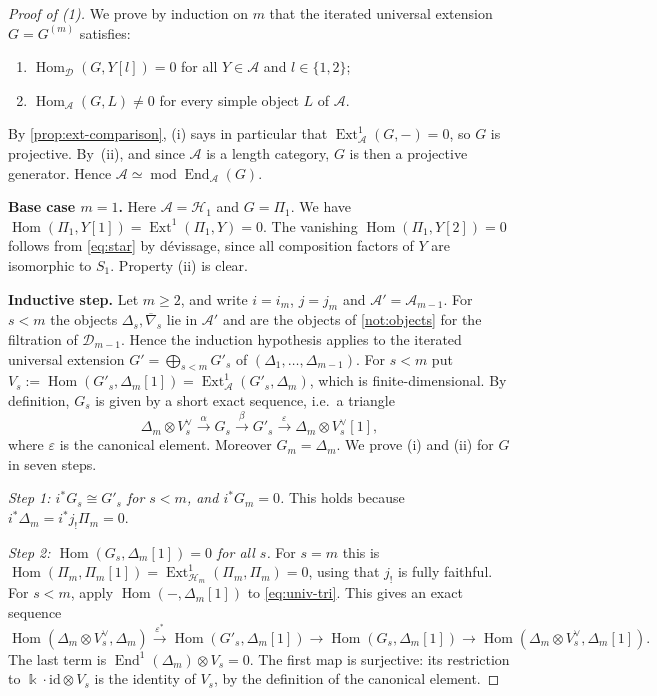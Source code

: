 \documentclass[11pt,reqno]{amsart}
\theoremstyle{plain}
\theoremstyle{definition}
\theoremstyle{remark}
\newcommand{\kk}{\Bbbk}
\DeclareMathOperator{\Hom}{Hom}
\DeclareMathOperator{\End}{End}
\DeclareMathOperator{\Ext}{Ext}
\newcommand{\modd}{\operatorname{mod}}
\newcommand{\nablabar}{\overline{\nabla}}
\newcommand{\cD}{\mathcal{D}}
\newcommand{\cA}{\mathcal{A}}
\newcommand{\cH}{\mathcal{H}}
\begin{document}
\begin{proof}[Proof of \textup{(1)}]
We prove by induction on $m$ that the iterated universal extension $G=G^{(m)}$ satisfies:
\begin{enumerate}[label=(\roman*)]
\item $\Hom_\cD(G,Y[l])=0$ for all $Y\in\cA$ and $l\in\{1,2\}$;
\item $\Hom_\cA(G,L)\ne0$ for every simple object $L$ of $\cA$.
\end{enumerate}
By \cref{prop:ext-comparison}, (i) says in particular that $\Ext^1_\cA(G,-)=0$, so $G$ is projective. By~(ii), and since $\cA$ is a length category, $G$ is then a projective generator. Hence $\cA\simeq\modd\End_\cA(G)$.

\smallskip\noindent\textbf{Base case $m=1$.} Here $\cA=\cH_1$ and $G=\Pi_1$. We have $\Hom(\Pi_1,Y[1])=\Ext^1(\Pi_1,Y)=0$. The vanishing $\Hom(\Pi_1,Y[2])=0$ follows from \eqref{eq:star} by d\'evissage, since all composition factors of $Y$ are isomorphic to $S_1$. Property (ii) is clear.

\smallskip\noindent\textbf{Inductive step.} Let $m\ge2$, and write $i=i_m$, $j=j_m$ and $\cA'=\cA_{m-1}$. For $s<m$ the objects $\Delta_s,\nablabar_s$ lie in $\cA'$ and are the objects of \cref{not:objects} for the filtration of $\cD_{m-1}$. Hence the induction hypothesis applies to the iterated universal extension $G'=\bigoplus_{s<m}G'_s$ of $(\Delta_1,\dots,\Delta_{m-1})$. For $s<m$ put $V_s:=\Hom(G'_s,\Delta_m[1])=\Ext^1_\cA(G'_s,\Delta_m)$, which is finite-dimensional. By definition, $G_s$ is given by a short exact sequence, i.e.\ a triangle
\begin{equation}\label{eq:univ-tri}
\Delta_m\otimes V_s^\vee\xrightarrow{\alpha}G_s\xrightarrow{\beta}G'_s\xrightarrow{\varepsilon}\Delta_m\otimes V_s^\vee[1],
\end{equation}
where $\varepsilon$ is the canonical element. Moreover $G_m=\Delta_m$. We prove (i) and (ii) for $G$ in seven steps.

\emph{Step 1: $i^*G_s\cong G'_s$ for $s<m$, and $i^*G_m=0$.} This holds because $i^*\Delta_m=i^*j_!\Pi_m=0$.

\emph{Step 2: $\Hom(G_s,\Delta_m[1])=0$ for all $s$.} For $s=m$ this is $\Hom(\Pi_m,\Pi_m[1])=\Ext^1_{\cH_m}(\Pi_m,\Pi_m)=0$, using that $j_!$ is fully faithful. For $s<m$, apply $\Hom(-,\Delta_m[1])$ to \eqref{eq:univ-tri}. This gives an exact sequence
\[\Hom(\Delta_m\otimes V_s^\vee,\Delta_m)\xrightarrow{\varepsilon^*}\Hom(G'_s,\Delta_m[1])\to\Hom(G_s,\Delta_m[1])\to\Hom(\Delta_m\otimes V_s^\vee,\Delta_m[1]).\]
The last term is $\End^1(\Delta_m)\otimes V_s=0$. The first map is surjective: its restriction to $\kk\cdot\mathrm{id}\otimes V_s$ is the identity of $V_s$, by the definition of the canonical element.


\end{proof}
\end{document}
